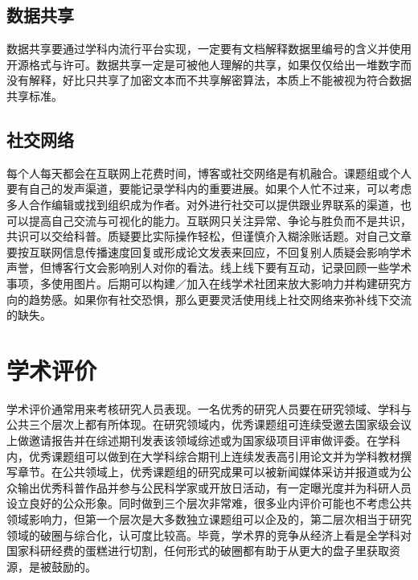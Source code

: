 \documentclass[]{tufte-book}
\begin{document}
\hypertarget{ux6570ux636eux5171ux4eab}{%
\subsection{数据共享}\label{ux6570ux636eux5171ux4eab}}

数据共享要通过学科内流行平台实现，一定要有文档解释数据里编号的含义并使用开源格式与许可。数据共享一定是可被他人理解的共享，如果仅仅给出一堆数字而没有解释，好比只共享了加密文本而不共享解密算法，本质上不能被视为符合数据共享标准。

\hypertarget{ux793eux4ea4ux7f51ux7edc}{%
\subsection{社交网络}\label{ux793eux4ea4ux7f51ux7edc}}

每个人每天都会在互联网上花费时间，博客或社交网络是有机融合。课题组或个人要有自己的发声渠道，要能记录学科内的重要进展。如果个人忙不过来，可以考虑多人合作编辑或找到组织成为作者。对外进行社交可以提供跟业界联系的渠道，也可以提高自己交流与可视化的能力。互联网只关注异常、争论与胜负而不是共识，共识可以交给科普。质疑要比实际操作轻松，但谨慎介入糊涂账话题。对自己文章要按互联网信息传播速度回复或形成论文发表来回应，不回复别人质疑会影响学术声誉，但博客行文会影响别人对你的看法。线上线下要有互动，记录回顾一些学术事项，多使用图片。后期可以构建／加入在线学术社团来放大影响力并构建研究方向的趋势感。如果你有社交恐惧，那么更要灵活使用线上社交网络来弥补线下交流的缺失。

\hypertarget{ux5b66ux672fux8bc4ux4ef7}{%
\section{学术评价}\label{ux5b66ux672fux8bc4ux4ef7}}

学术评价通常用来考核研究人员表现。一名优秀的研究人员要在研究领域、学科与公共三个层次上都有所体现。在研究领域内，优秀课题组可连续受邀去国家级会议上做邀请报告并在综述期刊发表该领域综述或为国家级项目评审做评委。在学科内，优秀课题组可以做到在大学科综合期刊上连续发表高引用论文并为学科教材撰写章节。在公共领域上，优秀课题组的研究成果可以被新闻媒体采访并报道或为公众输出优秀科普作品并参与公民科学家或开放日活动，有一定曝光度并为科研人员设立良好的公众形象。同时做到三个层次非常难，很多业内评价可能也不考虑公共领域影响力，但第一个层次是大多数独立课题组可以企及的，第二层次相当于研究领域的破圈与综合化，认可度比较高。毕竟，学术界的竞争从经济上看是全学科对国家科研经费的蛋糕进行切割，任何形式的破圈都有助于从更大的盘子里获取资源，是被鼓励的。
\end{document}
